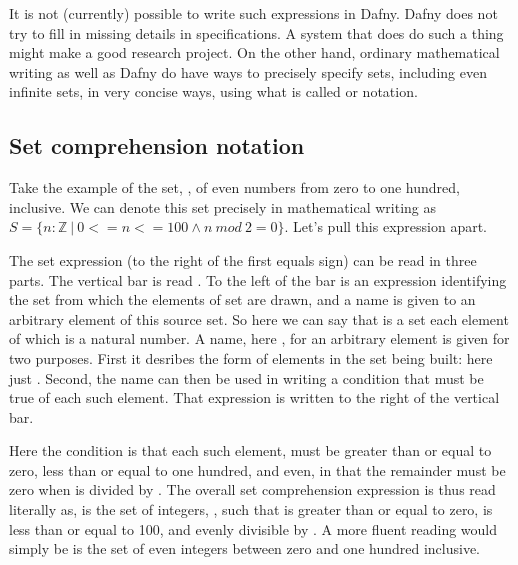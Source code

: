 \documentclass[letterpaper,10pt,english]{sphinxmanual}
\begin{document}
It is not (currently) possible to write such expressions in Dafny.
Dafny does not try to fill in missing details in specifications. A
system that does do such a thing might make a good research project.
On the other hand, ordinary mathematical writing as well as Dafny do
have ways to precisely specify sets, including even infinite sets, in
very concise ways, using what is called  or  notation.


\subsection{Set comprehension notation}
\label{\detokenize{07-set-theory:set-comprehension-notation}}
Take the example of the set, , of even numbers from zero to one
hundred, inclusive. We can denote this set precisely in mathematical
writing as \(S = \{ n: {\mathbb Z}~|~0 <= n <= 100 \land n~mod~2
= 0 \}.\) Let’s pull this expression apart.

The set expression (to the right of the first equals sign) can be read
in three parts. The vertical bar is read . To the left of
the bar is an expression identifying the set from which the elements
of  set are drawn, and a name is given to an arbitrary element
of this source set. So here we can say that  is a set each element
 of which is a natural number.  A name, here , for an arbitrary
element is given for two purposes. First it desribes the form of
elements in the set being built: here just . Second, the
name can then be used in writing a condition that must be true of each
such element.  That expression is written to the right of the vertical
bar.

Here the condition is that each such element,  must be greater than
or equal to zero, less than or equal to one hundred, and even, in that
the remainder must be zero when  is divided by . The overall set
comprehension expression is thus read literally as,  is the set of
integers, , such that  is greater than or equal to zero,  is
less than or equal to 100, and  evenly divisible by . A more
fluent reading would simply be  is the set of even integers between
zero and one hundred inclusive.
\end{document}
